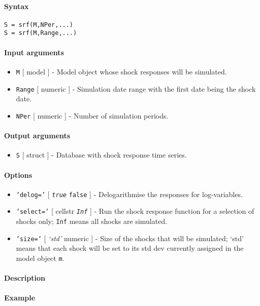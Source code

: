 


	\paragraph{Syntax}\label{syntax}

\begin{verbatim}
S = srf(M,NPer,...)
S = srf(M,Range,...)
\end{verbatim}

\paragraph{Input arguments}\label{input-arguments}

\begin{itemize}
\item
  \texttt{M} {[} model {]} - Model object whose shock responses will be
  simulated.
\item
  \texttt{Range} {[} numeric {]} - Simulation date range with the first
  date being the shock date.
\item
  \texttt{NPer} {[} numeric {]} - Number of simulation periods.
\end{itemize}

\paragraph{Output arguments}\label{output-arguments}

\begin{itemize}
\itemsep1pt\parskip0pt
\item
  \texttt{S} {[} struct {]} - Database with shock response time series.
\end{itemize}

\paragraph{Options}\label{options}

\begin{itemize}
\item
  \texttt{'delog='} {[} \emph{\texttt{true}} \textbar{} \texttt{false}
  {]} - Delogarithmise the responses for log-variables.
\item
  \texttt{'select='} {[} cellstr \textbar{} \emph{\texttt{Inf}} {]} -
  Run the shock response function for a selection of shocks only;
  \texttt{Inf} means all shocks are simulated.
\item
  \texttt{'size='} {[} \emph{`std'} \textbar{} numeric {]} - Size of the
  shocks that will be simulated; `std' means that each shock will be set
  to its std dev currently assigned in the model object \texttt{m}.
\end{itemize}

\paragraph{Description}\label{description}

\paragraph{Example}\label{example}


